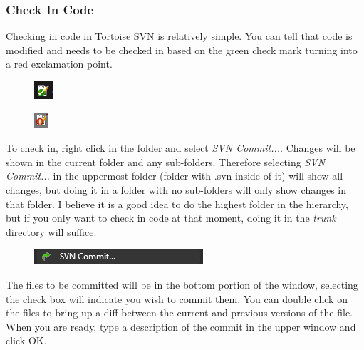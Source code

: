 \documentclass[10pt]{article}
\begin{document}
            \subsubsection{Check In Code}
                Checking in code in Tortoise SVN is relatively simple. You can tell that code is modified and needs to be checked in based on the green check mark turning into a red exclamation point.
                \begin{figure}[H]
                    \centerline{\includegraphics{References/Check.png}}
                \end{figure}
                \begin{figure}[H]
                    \centerline{\includegraphics{References/X.png}}
                \end{figure}
                To check in, right click in the folder and select \emph{SVN Commit...}. Changes will be shown in the current folder and any sub-folders. Therefore selecting \emph{SVN Commit...} in the uppermost folder (folder with .svn inside of it) will show all changes, but doing it in a folder with no sub-folders will only show changes in that folder. I believe it is a good idea to do the highest folder in the hierarchy, but if you only want to check in code at that moment, doing it in the \emph{trunk} directory will suffice.
                \begin{figure}[H]
                    \centerline{\includegraphics{References/SVN Commit.png}}
                \end{figure}
                The files to be committed will be in the bottom portion of the window, selecting the check box will indicate you wish to commit them. You can double click on the files to bring up a diff between the current and previous versions of the file. When you are ready, type a description of the commit in the upper window and click OK.
\end{document}
